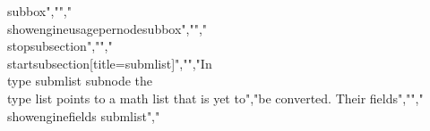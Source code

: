 {subbox}","","\\showengineusagepernode{subbox}","","\\stopsubsection","","\\startsubsection[title=submlist]","","In \\type {submlist} subnode the \\type {list} points to a math list that is yet to","be converted. Their fields","","\\showenginefields   {submlist}","%